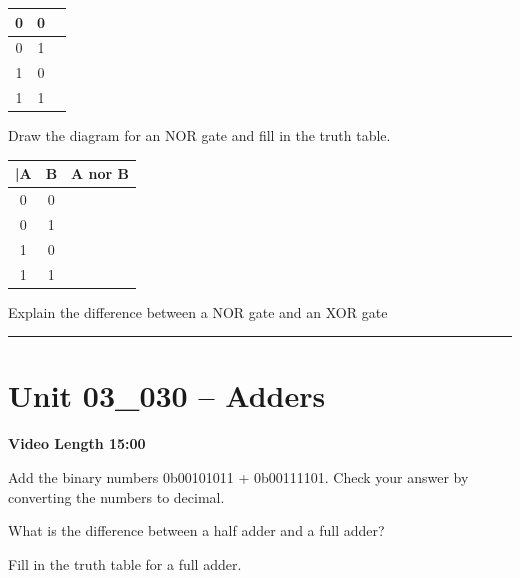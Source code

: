 \documentclass[letterpaper,12pt]{exam}
\newcommand{\unit}{Unit 03}
\begin{document}
\begin{questions}
\begin{samepage}
\begin{tabular}{|c|c|c|}
      \hline
      \hline
      0 & 0 &  \\
      \hline
      0 & 1 &  \\
      \hline
      1 & 0 &  \\
      \hline
      1 & 1 &  \\  
      \hline     
    \end{tabular}
    \vspace{5mm}
\end{samepage}
\begin{samepage}
    \question Draw the diagram for an NOR gate and fill in the truth table.
    \par
    \begin{tabular}{|c|c|c|}
      |A & B & A nor B \\
      \hline
      \hline
      0 & 0 &  \\
      \hline
      0 & 1 &  \\
      \hline
      1 & 0 &  \\
      \hline
      1 & 1 &  \\  
      \hline     
    \end{tabular}
    \vspace{5mm}
\end{samepage}
\begin{samepage}
    \question Explain the difference between a NOR gate and an XOR gate
    \vspace{5mm}
\end{samepage}
\par
 
\par
\rule{0.5\textwidth}{.4pt} %
\section*{\unit\_030 -- Adders}
\par{\selectfont\textbf{Video Length 15:00}}
\begin{samepage}
    \question Add the binary numbers 0b00101011 + 0b00111101.  Check your answer by converting the numbers to decimal.
    \vspace{5mm}
\end{samepage}
\par
\begin{samepage}
    \question What is the difference between a half adder and a full adder?
    \vspace{5mm}
\end{samepage}
\par
\begin{samepage}
    \question Fill in the truth table for a full adder.
    \par 


\end{samepage}
\end{questions}
\end{document}

